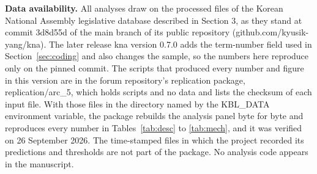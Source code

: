\documentclass[11pt]{article}
\begin{document}
\medskip
\noindent\textbf{Data availability.} All analyses draw on the processed files of the Korean National Assembly legislative database described in Section 3, as they stand at commit 3d8d55d of the main branch of its public repository (github.com/kyusik-yang/kna). The later release kna version 0.7.0 adds the term-number field used in Section~\ref{sec:coding} and also changes the sample, so the numbers here reproduce only on the pinned commit. The scripts that produced every number and figure in this version are in the forum repository's replication package, replication/arc\_5, which holds scripts and no data and lists the checksum of each input file. With those files in the directory named by the KBL\_DATA environment variable, the package rebuilds the analysis panel byte for byte and reproduces every number in Tables~\ref{tab:desc} to \ref{tab:mech}, and it was verified on 26 September 2026. The time-stamped files in which the project recorded its predictions and thresholds are not part of the package. No analysis code appears in the manuscript.



\end{document}
